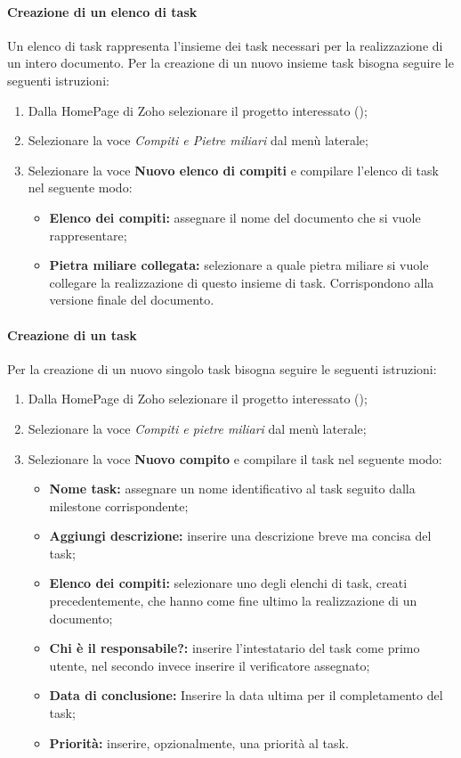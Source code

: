 \paragraph{Creazione di un elenco di task}
Un elenco di task rappresenta l'insieme dei task necessari per la realizzazione di un intero documento.
Per la creazione di un nuovo insieme task bisogna seguire le seguenti istruzioni:
\begin{enumerate}
   \item Dalla HomePage di Zoho selezionare il progetto interessato (\progetto);
  \item Selezionare la voce \textsl{Compiti e Pietre miliari} dal menù laterale;
   \item Selezionare la voce \textbf{Nuovo elenco di compiti} e compilare l'elenco di task nel 
  seguente modo:
  \begin{itemize}
    \item \textbf{Elenco dei compiti:} assegnare il nome del documento che si 
    vuole rappresentare;
    \item \textbf{Pietra miliare collegata:} selezionare a quale pietra miliare si 
    vuole collegare la realizzazione di questo insieme di task. Corrispondono alla 
    versione finale del documento.
  \end{itemize}
\end{enumerate}
\paragraph{Creazione di un task}
Per la creazione di un nuovo singolo task bisogna seguire le seguenti 
istruzioni:
\begin{enumerate}
  \item Dalla HomePage di Zoho selezionare il progetto interessato (\progetto);
  \item Selezionare la voce \textsl{Compiti e pietre miliari} dal menù laterale;
  \item Selezionare la voce \textbf{Nuovo compito} e compilare il task nel 
  seguente modo:
    \begin{itemize}
      \item \textbf{Nome task:} assegnare un nome identificativo al task seguito dalla milestone corrispondente;
      \item \textbf{Aggiungi descrizione:} inserire una descrizione breve ma 
      concisa del task;
      \item \textbf{Elenco dei compiti:} selezionare uno degli elenchi di 
      task, creati precedentemente, che hanno come fine ultimo la realizzazione di un 
      documento;
      \item \textbf{Chi è il responsabile?:} inserire l'intestatario del task 
      come primo utente, nel secondo invece inserire il verificatore assegnato;
      \item \textbf{Data di conclusione:} Inserire la data ultima per il 
      completamento del task;
     \item \textbf{Priorità:} inserire, opzionalmente, una priorità al task.
    \end{itemize}
\end{enumerate}


